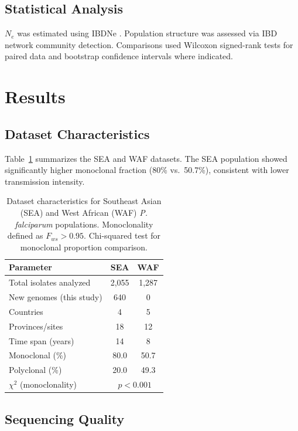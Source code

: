 \documentclass[11pt]{article}
\begin{document}
\subsection{Statistical Analysis}

$N_e$ was estimated using IBDNe \citep{browning2015accurate}. Population structure was assessed via IBD network community detection. Comparisons used Wilcoxon signed-rank tests for paired data and bootstrap confidence intervals where indicated.

\section{Results}

\subsection{Dataset Characteristics}

Table~\ref{tab:dataset} summarizes the SEA and WAF datasets. The SEA population showed significantly higher monoclonal fraction (80\% vs.\ 50.7\%), consistent with lower transmission intensity.

\begin{table}[H]
\centering
\caption{Dataset characteristics for Southeast Asian (SEA) and West African (WAF) \textit{P. falciparum} populations. Monoclonality defined as $F_{ws} > 0.95$. Chi-squared test for monoclonal proportion comparison.}
\label{tab:dataset}
\begin{tabular}{lcc}
\toprule
Parameter & SEA & WAF \\
\midrule
Total isolates analyzed & 2,055 & 1,287 \\
New genomes (this study) & 640 & 0 \\
Countries & 4 & 5 \\
Provinces/sites & 18 & 12 \\
Time span (years) & 14 & 8 \\
Monoclonal (\%) & 80.0 & 50.7 \\
Polyclonal (\%) & 20.0 & 49.3 \\
$\chi^2$ (monoclonality) & \multicolumn{2}{c}{$p < 0.001$} \\
\bottomrule
\end{tabular}
\end{table}

\subsection{Sequencing Quality}
\end{document}
